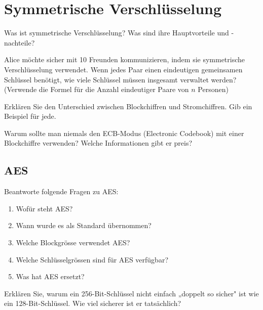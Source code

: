 \documentclass[11pt,a4paper]{report}
\begin{document}
\section{Symmetrische Verschlüsselung}

\begin{ex}
Was ist symmetrische Verschlüsselung? Was sind ihre Hauptvorteile und -nachteile?
\end{ex}

\begin{ex}
Alice möchte sicher mit 10 Freunden kommunizieren, indem sie symmetrische Verschlüsselung verwendet. Wenn jedes Paar einen eindeutigen gemeinsamen Schlüssel benötigt, wie viele Schlüssel müssen insgesamt verwaltet werden? (Verwende die Formel für die Anzahl eindeutiger Paare von $n$ Personen)
\end{ex}

\begin{ex}
Erklären Sie den Unterschied zwischen Blockchiffren und Stromchiffren. Gib ein Beispiel für jede.
\end{ex}

\begin{ex}
Warum sollte man niemals den ECB-Modus (Electronic Codebook) mit einer Blockchiffre verwenden? Welche Informationen gibt er preis?
\end{ex}

\subsection{AES}

\begin{ex}
Beantworte folgende Fragen zu AES:
\begin{enumerate}[label=\alph*)]
    \item Wofür steht AES?
    \item Wann wurde es als Standard übernommen?
    \item Welche Blockgrösse verwendet AES?
    \item Welche Schlüsselgrössen sind für AES verfügbar?
    \item Was hat AES ersetzt?
\end{enumerate}
\end{ex}

\begin{ex}
Erklären Sie, warum ein 256-Bit-Schlüssel nicht einfach „doppelt so sicher" ist wie ein 128-Bit-Schlüssel. Wie viel sicherer ist er tatsächlich?
\end{ex}
\end{document}
